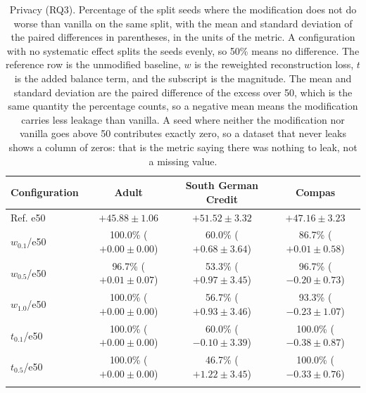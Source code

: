 \begin{table}[t]
\centering
\small
\caption{Privacy (RQ3). Percentage of the split seeds where the modification does not do worse than vanilla on the same split, with the mean and standard deviation of the paired differences in parentheses, in the units of the metric. A configuration with no systematic effect splits the seeds evenly, so 50\% means no difference. The reference row is the unmodified baseline, $w$ is the reweighted reconstruction loss, $t$ is the added balance term, and the subscript is the magnitude. The mean and standard deviation are the paired difference of the excess over 50, which is the same quantity the percentage counts, so a negative mean means the modification carries less leakage than vanilla. A seed where neither the modification nor vanilla goes above 50 contributes exactly zero, so a dataset that never leaks shows a column of zeros: that is the metric saying there was nothing to leak, not a missing value.}
\label{tab:stats-privacy}
\begin{tabular}{p{1.5cm}ccc}
\toprule
Configuration & Adult & South German Credit & Compas \\
\midrule
Ref. e50 & $+45.88 \pm 1.06$ & $+51.52 \pm 3.32$ & $+47.16 \pm 3.23$ \\ \hline
$w_{0.1}$/e50 & \makecell{100.0\% \\ ($+0.00 \pm 0.00$)} & \makecell{60.0\% \\ ($+0.68 \pm 3.64$)} & \makecell{86.7\% \\ ($+0.01 \pm 0.58$)} \\ \hdashline
$w_{0.5}$/e50 & \makecell{96.7\% \\ ($+0.01 \pm 0.07$)} & \makecell{53.3\% \\ ($+0.97 \pm 3.45$)} & \makecell{96.7\% \\ ($-0.20 \pm 0.73$)} \\ \hdashline
$w_{1.0}$/e50 & \makecell{100.0\% \\ ($+0.00 \pm 0.00$)} & \makecell{56.7\% \\ ($+0.93 \pm 3.46$)} & \makecell{93.3\% \\ ($-0.23 \pm 1.07$)} \\ \hdashline
$t_{0.1}$/e50 & \makecell{100.0\% \\ ($+0.00 \pm 0.00$)} & \makecell{60.0\% \\ ($-0.10 \pm 3.39$)} & \makecell{100.0\% \\ ($-0.38 \pm 0.87$)} \\ \hdashline
$t_{0.5}$/e50 & \makecell{100.0\% \\ ($+0.00 \pm 0.00$)} & \makecell{46.7\% \\ ($+1.22 \pm 3.45$)} & \makecell{100.0\% \\ ($-0.33 \pm 0.76$)} \\ \hdashline

\end{tabular}
\end{table}
